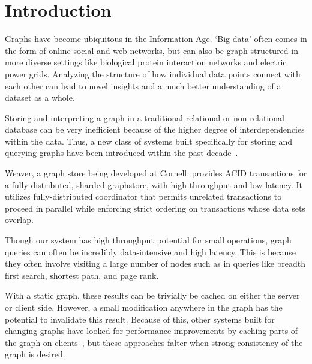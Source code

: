 \documentclass[letterpaper,twocolumn,11pt,tight]{article}
\begin{document}
\section{Introduction}\label{sec:intro}
Graphs have become ubiquitous in the Information Age. 
`Big data' often comes in the form of online social and web networks, but can
also be graph-structured in more diverse settings like biological protein
interaction networks and electric power grids.
Analyzing the structure of how individual data points connect with each other can lead to novel insights and a much better understanding of a dataset as a whole.

Storing and interpreting a graph in a traditional relational or non-relational database can be very inefficient because of the higher degree of interdependencies within the data. Thus, a new class of systems built specifically for storing and querying graphs have been introduced within the past decade~\cite{giraph,tao,powergraph,pregel,memcache_fb,gps,trinity}.

Weaver, a graph store being developed at Cornell, provides ACID transactions for a fully distributed, sharded graphstore, with high throughput and low latency.
It utilizes fully-distributed coordinator that permits unrelated transactions to proceed in parallel while enforcing strict ordering on transactions whose data sets overlap.

Though our system has high throughput potential for small operations, graph queries can often be incredibly data-intensive and high latency.
This is because they often involve visiting a large number of nodes such as in queries like breadth first search, shortest path, and page rank.

With a static graph, these results can be trivially be cached on either the server or client side. However, a small modification anywhere in the graph has the potential to invalidate this result. Because of this, other systems built for changing graphs have looked for performance improvements by caching parts of the graph on clients~\cite{titan}, but these approaches falter when strong consistency of the graph is desired.

\end{document}
